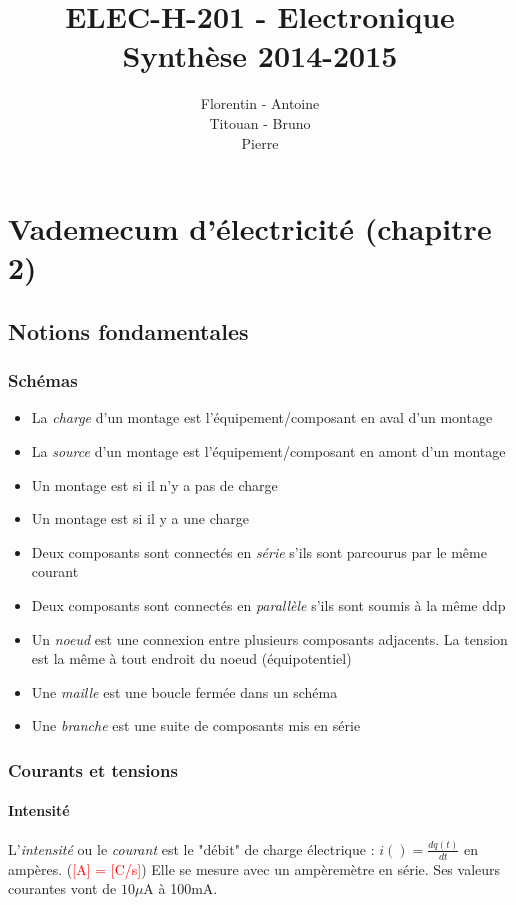 \documentclass[a4paper]{article}
\title{
    ELEC-H-201 - Electronique\\
    \small Synthèse 2014-2015
}
\author{Florentin \bsc{Hennecker} - Antoine \bsc{Carpentier}\\
Titouan \bsc{Christophe} - Bruno \bsc{Rocha Pereira}\\
Pierre \bsc{Gérard}}
\date{}
\begin{document}
\maketitle
\tableofcontents

\section{Vademecum d'électricité (chapitre 2)}

    \subsection{Notions fondamentales}

    \subsubsection{Schémas}
    \begin{itemize}
        \item La \textit{charge} d'un montage est l'équipement/composant en aval d'un montage
        \item La \textit{source} d'un montage est l'équipement/composant en amont d'un montage
        \item Un montage est  si il n'y a pas de charge
        \item Un montage est  si il y a une charge
        \item Deux composants sont connectés en \textit{série} s'ils sont parcourus par le même courant
        \item Deux composants sont connectés en \textit{parallèle} s'ils sont soumis à la même ddp
        \item Un \textit{noeud} est une connexion entre plusieurs composants adjacents. La tension est la même à tout endroit du noeud (équipotentiel)
        \item Une \textit{maille} est une boucle fermée dans un schéma
        \item Une \textit{branche} est une suite de composants mis en série
    \end{itemize}

    \subsubsection{Courants et tensions}

    \paragraph{Intensité} L'\textit{intensité} ou le \textit{courant} 
    est le "débit" de charge électrique : $i() = \frac{dq(t)}{dt}$ en ampères. 
    (\textcolor{red}{[A] = [C/s]}) Elle se mesure avec un ampèremètre en série.
    Ses valeurs courantes vont de $10\mu$A à 100mA.\\
\end{document}
